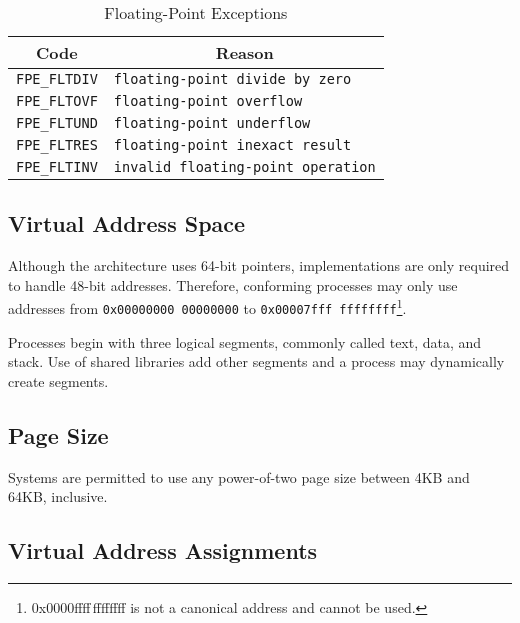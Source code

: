 \begin{table}
\Hrule
  \caption{Floating-Point Exceptions}
  \begin{center}
    \begin{tabular}[t]{l|l}
      \multicolumn{1}{c}{Code} & \multicolumn{1}{c}{Reason} \\
      \hline
      \texttt{FPE\_FLTDIV} & \texttt{floating-point divide by zero} \\
      \texttt{FPE\_FLTOVF} & \texttt{floating-point overflow} \\
      \texttt{FPE\_FLTUND} & \texttt{floating-point underflow} \\
      \texttt{FPE\_FLTRES} & \texttt{floating-point inexact result} \\
      \texttt{FPE\_FLTINV} & \texttt{invalid floating-point operation}
    \end{tabular}
  \end{center}
\Hrule
\end{table}

\subsection{Virtual Address Space}

Although the \xARCH architecture uses 64-bit pointers, implementations
are only required to handle 48-bit addresses.  Therefore, conforming
processes may only use addresses from \texttt{0x00000000\,00000000} to
\texttt{0x00007fff\,ffffffff}\footnote{0x0000ffff\,ffffffff is not a
  canonical address and cannot be used.}.

Processes begin with three logical segments, commonly called text,
data, and stack. Use of shared libraries add other segments and
a process may dynamically create segments.

\subsection{Page Size}

Systems are permitted to use any power-of-two page size between 4KB
and 64KB, inclusive.

\subsection{Virtual Address Assignments}

